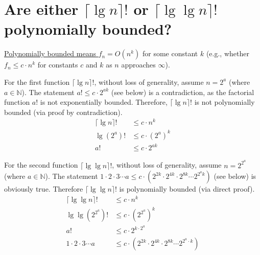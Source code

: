 \section[Problem 1]{Are either $\lceil \lg n \rceil!$ or $\lceil \lg \lg n \rceil!$ polynomially bounded?}

\ul{Polynomially bounded means $f_n = O(n^k)$} for some constant $k$ (e.g., whether $f_n \leq c \cdot n^k$ for constants $c$ and $k$ as $n$ approaches $\infty$).

For the first function $\lceil \lg n \rceil!$, without loss of generality, assume $n = 2^a$ (where $a \in \mathbb{N}$). The statement $a! \leq c \cdot 2^{ak}$ (see below) is a contradiction, as the factorial function $a!$ is not exponentially bounded. Therefore, $\lceil \lg n \rceil!$ is not polynomially bounded (via proof by contradiction).
\begin{align*}
	\lceil \lg n \rceil ! & \leq c \cdot n^k \\
	\lg (2^a) ! & \leq c \cdot (2^a)^k \\
	a! & \leq c \cdot 2^{ak}
\end{align*}


For the second function $\lceil \lg \lg n \rceil!$, without loss of generality, assume $n = 2^{2^a}$ (where $a \in \mathbb{N}$). The statement $1 \cdot 2 \cdot 3 \cdots a \leq c \cdot \left( 2^{2k} \cdot 2^{4k} \cdot 2^{8k} \cdots 2^{2^a k} \right)$ (see below) is obviously true. Therefore $\lceil \lg \lg n \rceil!$ is polynomially bounded (via direct proof).
\begin{align*}
	 \lceil \lg \lg n \rceil! & \leq c \cdot n^k \\
	 \lg \lg \left( 2^{2^a} \right) ! & \leq c \cdot \left( 2^{2^a} \right)^k \\
	 a! & \leq c \cdot 2^{k \cdot {2^a}} \\
	 1 \cdot 2 \cdot 3 \cdots a & \leq c \cdot \left( 2^{2k} \cdot 2^{4k} \cdot 2^{8k} \cdots 2^{2^a \cdot k} \right)
\end{align*}


